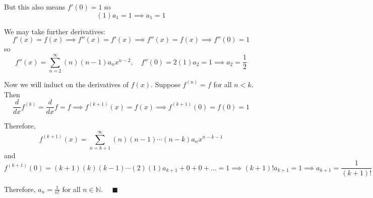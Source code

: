 \documentclass[12pt]{article}
\newcommand{\N}{\mathbb{N}}
\newcommand{\qed}{\quad \blacksquare}
\begin{document}
\begin{enumerate}
            But this also means $f'(0) = 1$ so 
            \[(1)a_1 = 1 \implies a_1 = 1\]

            We may take further derivatives:
            \[f'(x) = f(x) \implies f''(x) = f'(x) \implies f''(x) = f(x) \implies f''(0) = 1\]
            so 
            \[f''(x) = \sum_{n=2}^{\infty} (n)(n-1) a_n x^{n-2}, \quad f''(0) = 2(1)a_2 = 1 \implies a_2 = \frac{1}{2}\]

            Now we will induct on the derivatives of $f(x)$. Suppose $f^{(n)} = f$ for all $n < k$. Then
            \[\frac{d}{dx} f^{(k)} = \frac{d}{dx} f = f \implies f^{(k + 1)}(x) = f(x) \implies f^{(k+1)}(0) = f(0) = 1\]

            Therefore, 
            \[f^{(k+1)}(x) = \sum_{n = k +1}^{\infty} (n)(n - 1) \cdots (n - k) a_n x^{n- k - 1}\]
            and 
            \[f^{(k+1)}(0) = (k + 1)(k)(k -1)\cdots(2)(1) a_{k+1} + 0 + 0 + \dots = 1 \implies (k+1)! a_{k+1} = 1 \implies a_{k+1} = \frac{1}{(k+1)!}\]
            
            Therefore, $a_n = \frac{1}{n!}$ for all $n \in \N$. $\qed$
        \color{black}

\end{enumerate}
\pagebreak
\end{document}
